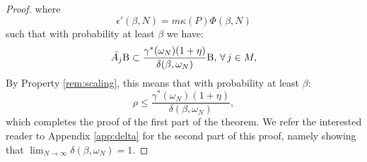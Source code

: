 \begin{proof}
where
\begin{equation}\label{eqn:eps2}\epsilon'(\beta, N) = m\kappa(P)\Phi(\beta,N)\end{equation} such that with probability at least $\beta$ we have:
\begin{equation*}
\bar{A_j} \text{B} \subset \frac{\gamma^*(\omega_N)(1+\eta)}{\delta(\beta, \omega_N)}\text{B},\, \forall\, j \in M,
\end{equation*}
By Property \ref{rem:scaling}, this means that with probability at least $\beta$:
$$\rho \leq \frac{\gamma^*(\omega_N) (1 + \eta)}{\delta(\beta, \omega_N)},$$
which completes the proof of the first part of the theorem. We refer the interested reader to Appendix \ref{app:delta} for the second part of this proof, namely showing that $\lim_{N \to \infty}\delta(\beta, \omega_N) = 1$.



%
\end{proof}

